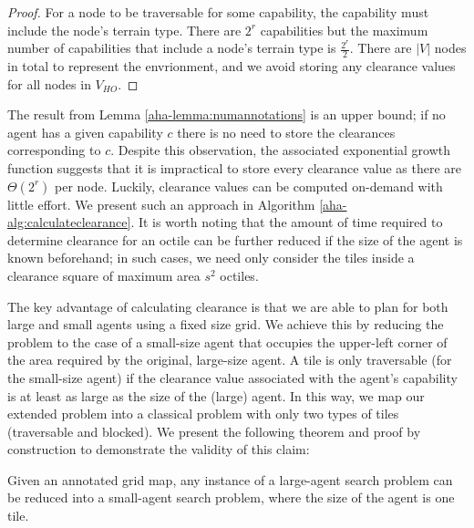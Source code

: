 \begin{proof}
For a node to be traversable for some capability, the capability must include the node's terrain type. 
There are $2^r$ capabilities but the maximum number of capabilities that include a node's terrain type is $\frac{2^r}{2}$. 
There are $|V|$ nodes in total to represent the envrionment, and we avoid storing any clearance values for all nodes in $V_{HO}$. 
\end{proof}

The result from Lemma \ref{aha-lemma:numannotations} is an upper bound; if no agent has a given capability $c$ there is no need to store the clearances corresponding to $c$.
Despite this observation, the associated exponential growth function suggests that it is impractical to store every clearance value as there are $\Theta(2^r)$ per node.
Luckily, clearance values can be computed on-demand with little effort. 
We present such an approach in Algorithm \ref{aha-alg:calculateclearance}. 
It is worth noting that the amount of time required to determine clearance for an octile can be further reduced if the size of the agent is known beforehand; in such cases, we need only consider the tiles inside a clearance square of maximum area $s^2$ octiles.

\par \indent
The key advantage of calculating clearance is that we are able to plan for both large and small agents using a fixed size grid. 
We achieve this by reducing the problem to the case of a small-size agent that occupies the upper-left corner of the area required by the original, large-size agent. 
A tile is only traversable (for the small-size agent) if the clearance value associated with the agent's capability is at least as large as the size of the (large) agent.
In this way, we map our extended problem into a classical problem with only two types of tiles (traversable and blocked).
We present the following theorem and proof by construction to demonstrate the validity of this claim:
\begin{theorem}
\label{aha-theorem:reducibility}
Given an annotated grid map, any instance of a large-agent search problem can be reduced into a small-agent search problem, where the size of the agent is one tile.
\end{theorem}

